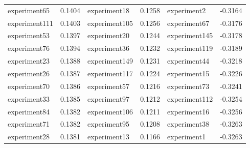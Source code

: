 \begin{table}[ht]
{\begin{tabular}{lr@{\hspace{1cm}}lr@{\hspace{1cm}}lr}
            experiment65                          & 0.1404                    & experiment18                     & 0.1258                     & experiment2                     & -0.3164                    \\
            experiment111                         & 0.1403                    & experiment105                    & 0.1256                     & experiment67                    & -0.3176                    \\
            experiment53                          & 0.1397                    & experiment20                     & 0.1244                     & experiment145                   & -0.3178                    \\
            experiment76                          & 0.1394                    & experiment36                     & 0.1232                     & experiment119                   & -0.3189                    \\
            experiment23                          & 0.1388                    & experiment149                    & 0.1231                     & experiment44                    & -0.3218                    \\
            experiment26                          & 0.1387                    & experiment117                    & 0.1224                     & experiment15                    & -0.3226                    \\
            experiment70                          & 0.1386                    & experiment57                     & 0.1216                     & experiment73                    & -0.3241                    \\
            experiment33                          & 0.1385                    & experiment97                     & 0.1212                     & experiment112                   & -0.3254                    \\
            experiment84                          & 0.1382                    & experiment106                    & 0.1211                     & experiment16                    & -0.3256                    \\
            experiment71                          & 0.1382                    & experiment95                     & 0.1208                     & experiment38                    & -0.3263                    \\
            experiment28                          & 0.1381                    & experiment13                     & 0.1166                     & experiment1                     & -0.3263                    \\

\end{tabular}}
\end{table}
